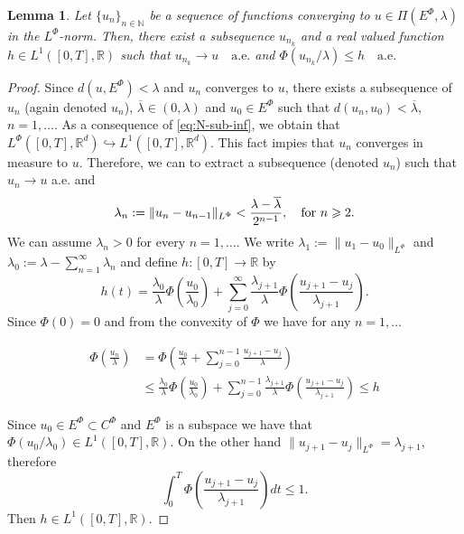 \documentclass[twoside]{article}
\newtheorem{lem}[thm]{Lemma}
\theoremstyle{remark}
\newcommand{\orlnor}{\|_{L^{\Phi}}}
\newcommand{\lphi}{L^{\Phi}}
\newcommand{\ephi}{E^{\Phi}}
\newcommand{\claseor}{C^{\Phi}}
\newcommand{\rr}{\mathbb{R}}
\renewcommand{\leq}{\leqslant}
\renewcommand{\geq}{\geqslant}
\begin{document}
\begin{lem}\label{segundo lema}
Let  $\{{u}_n\}_{n\in \mathbb{N}}$ be a sequence of  functions  converging to  ${u}\in \Pi(\ephi,\lambda)$  in the $\lphi$-norm. Then, there exist a subsequence
${u}_{n_k}$ and a real valued function $h\in L^1([0,T],\rr)$ such that ${u}_{n_k}\rightarrow {u} \quad\text{a.e.}$ and $\Phi({u}_{n_k}/\lambda)\leq h\quad\text{a.e.}$
\end{lem}

\begin{proof}
  Since $d({u},\ephi)<\lambda$ and ${u}_n$ converges to ${u}$, there exists   a subsequence of $u_n$ (again denoted $u_n$), $\overline{\lambda}\in (0,\lambda)$ and $u_0\in\ephi$ such that $d(u_n,u_0)<\overline{\lambda}$, $n=1,\ldots$. As a consequence of \eqref{eq:N-sub-inf}, we obtain that $\lphi\left([0,T],\rr^d\right)\hookrightarrow L^1\left([0,T],\rr^d\right)$. This fact impies that $u_n$ converges in measure to $u$. Therefore, we can to extract a subsequence (denoted $u_n$) such that $u_n\to u$ a.e. and
  \[\lambda_{n}:=\|{u}_{n}-{u}_{n-1}\orlnor<\frac{\lambda-\overline{\lambda}}{2^{n-1}},\quad\hbox{for } n\geq 2.\]
 We can assume $\lambda_n>0$ for every $n=1,\ldots$. We write $\lambda_1:=\|u_1-u_0\orlnor$ and  $\lambda_0:=\lambda-\sum_{n=1}^{\infty}\lambda_n$ and define $h:[0,T]\rightarrow\mathbb{R}$  by
 \begin{equation}\label{eq:serie} h(t)=  \frac{\lambda_0}{\lambda}\Phi\left(\frac{u_0}{\lambda_0}\right)+\sum_{j=0}^{\infty}\frac{\lambda_{j+1}}{\lambda}\Phi\left(\frac{u_{j+1}-u_j}{\lambda_{j+1}}\right).
\end{equation}
 Since $\Phi(0)=0$ and from the convexity of $\Phi$ we have for any $n=1,\ldots$


\[
 \begin{split}
   \Phi\left(\frac{u_n}{\lambda}\right) &=\Phi\left(  \frac{u_0}{\lambda}+   \sum_{j=0}^{n-1}\frac{u_{j+1}-u_j}{\lambda} \right)\\
   &\leq
   \frac{\lambda_0}{\lambda}\Phi\left(\frac{u_0}{\lambda_0}\right)+\sum_{j=0}^{n-1}\frac{\lambda_{j+1}}{\lambda}\Phi\left(\frac{u_{j+1}-u_j}{\lambda_{j+1}}\right) \leq h
 \end{split}
\]

Since $u_0\in\ephi\subset \claseor$ and $\ephi$ is a subspace we have that $\Phi(u_0/\lambda_0)\in L^1([0,T],\rr)$.
On the other hand $\|u_{j+1}-u_j\orlnor = \lambda_{j+1}$, therefore
\[
\int_0^T\Phi\left(\frac{u_{j+1}-u_j}{\lambda_{j+1}}\right)dt\leq 1.
\]
Then $h\in L^1([0,T],\rr)$.



\end{proof}
\end{document}
